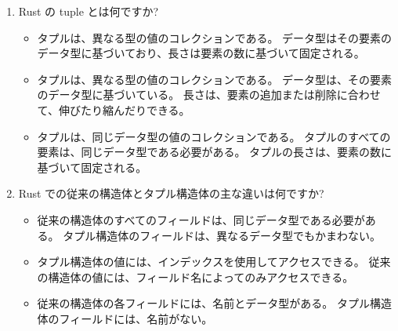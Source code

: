 \begin{enumerate}
\item Rust の tuple とは何ですか?

\begin{itemize}
\item タプルは、異なる型の値のコレクションである。 データ型はその要素のデータ型に基づいており、長さは要素の数に基づいて固定される。

\item タプルは、異なる型の値のコレクションである。 データ型は、その要素のデータ型に基づいている。 長さは、要素の追加または削除に合わせて、伸びたり縮んだりできる。

\item タプルは、同じデータ型の値のコレクションである。 タプルのすべての要素は、同じデータ型である必要がある。 タプルの長さは、要素の数に基づいて固定される。
\end{itemize}

\item Rust での従来の構造体とタプル構造体の主な違いは何ですか?

\begin{itemize}
\item 従来の構造体のすべてのフィールドは、同じデータ型である必要がある。 タプル構造体のフィールドは、異なるデータ型でもかまわない。

\item タプル構造体の値には、インデックスを使用してアクセスできる。 従来の構造体の値には、フィールド名によってのみアクセスできる。

\item 従来の構造体の各フィールドには、名前とデータ型がある。 タプル構造体のフィールドには、名前がない。
\end{itemize}

\end{enumerate}
